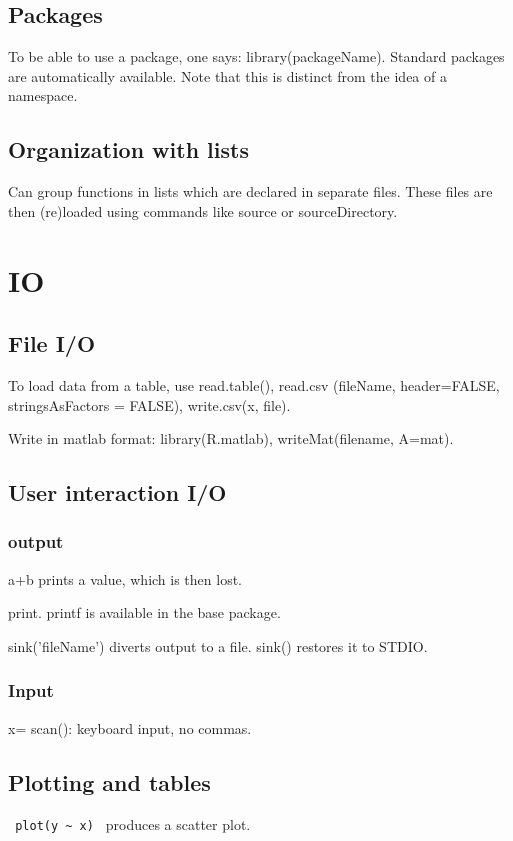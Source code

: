 \subsection{Packages}
To be able to use a package, one says: library(packageName). Standard packages are automatically available. Note that this is distinct from the idea of a namespace.

\subsection{Organization with lists}
Can group functions in lists which are declared in separate files. These files are then (re)loaded using commands like source or sourceDirectory.

\section{IO}
\subsection{File I/O}
To load data from a table, use read.table(), read.csv (fileName, header=FALSE, stringsAsFactors = FALSE), write.csv(x, file).

Write in matlab format: library(R.matlab), writeMat(filename, A=mat).

\subsection{User interaction I/O}
\subsubsection{output}
a+b prints a value, which is then lost.

print. printf is available in the base package.

sink('fileName') diverts output to a file. sink() restores it to STDIO.

\subsubsection{Input}
x= scan(): keyboard input, no commas.

\subsection{Plotting and tables}
\verb' plot(y ~ x) ' produces a scatter plot.

